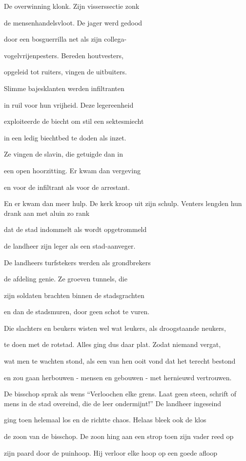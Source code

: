 De overwinning klonk.
Zijn visserssectie zonk

de mensenhandelsvloot.
De jager werd gedood

door een bosguerrilla
net als zijn collega-

vogelvrijenpesters.
Bereden houtvesters,

opgeleid tot ruiters,
vingen de uitbuiters.

Slimme bajesklanten
werden infiltranten

in ruil voor hun vrijheid.
Deze legereenheid

exploiteerde de biecht
om stil een sektesmiecht

in een ledig biechtbed
te doden als inzet.

Ze vingen de slavin,
die getuigde dan in

een open hoorzitting.
Er kwam dan vergeving

en voor de infiltrant
als voor de arrestant.

En er kwam dan meer hulp.
De kerk kroop uit zijn schulp.
Venters lengden hun drank
aan met aluin zo rank

dat de stad indommelt
als wordt opgetrommeld

de landheer zijn leger
als een stad-aanveger.

De landheers turfstekers
werden als grondbrekers

de afdeling genie.
Ze groeven tunnels, die

zijn soldaten brachten
binnen de stadsgrachten

en dan de stadsmuren,
door geen schot te vuren.

Die slachters en beukers
wisten wel wat leukers,
als droogstaande neukers,

te doen met de rotstad.
Alles ging dus daar plat.
Zodat niemand vergat,

wat men te wachten stond,
als een van hen ooit vond
dat het terecht bestond

en zou gaan herbouwen -
mensen en gebouwen -
met hernieuwd vertrouwen.

De bisschop sprak als wens
“Verloochen elke grens.
Laat geen steen, schrift of mens
in de stad overeind,
die de leer ondermijnt!”
De landheer ingeseind

ging toen helemaal los
en de richtte chaos.
Helaas bleek ook de klos

de zoon van de bisschop.
De zoon hing aan een strop
toen zijn vader reed op

zijn paard door de puinhoop.
Hij verloor elke hoop
op een goede afloop

